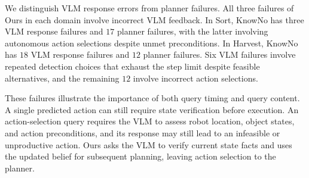 We distinguish VLM response errors from planner failures. All three failures of Ours in each domain involve incorrect VLM feedback. In Sort, KnowNo has three VLM response failures and $17$ planner failures, with the latter involving autonomous action selections despite unmet preconditions. In Harvest, KnowNo has $18$ VLM response failures and $12$ planner failures. Six VLM failures involve repeated detection choices that exhaust the step limit despite feasible alternatives, and the remaining $12$ involve incorrect action selections.

These failures illustrate the importance of both query timing and query content. A single predicted action can still require state verification before execution. An action-selection query requires the VLM to assess robot location, object states, and action preconditions, and its response may still lead to an infeasible or unproductive action. Ours asks the VLM to verify current state facts and uses the updated belief for subsequent planning, leaving action selection to the planner.





